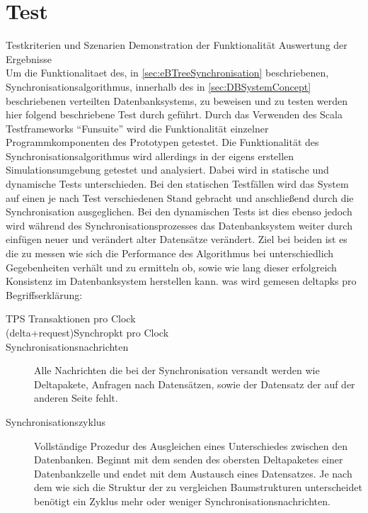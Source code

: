 \documentclass[a4paper,11pt,oneside,%
headsepline,												%
footsepline,												%
bibtotocnumbered									%
]{scrreprt}
\begin{document}
\chapter{Test}

 Testkriterien und Szenarien
Demonstration der Funktionalität
Auswertung der Ergebnisse\\

Um die Funktionalitaet des, in \autoref{sec:eBTreeSynchronisation} beschriebenen, Synchronisationsalgorithmus, innerhalb des in \autoref{sec:DBSystemConcept}	beschriebenen verteilten Datenbanksystems, zu beweisen und zu testen werden hier folgend beschriebene Test durch geführt. Durch das Verwenden des Scala Testframeworks \enquote{Funsuite} wird die Funktionalität einzelner Programmkomponenten des Prototypen getestet. Die Funktionalität des Synchronisationsalgorithmus wird allerdings in der eigens erstellen Simulationsumgebung getestet und analysiert. Dabei wird in statische und dynamische Tests unterschieden. Bei den statischen Testfällen wird das System auf einen je nach Test verschiedenen Stand gebracht und anschließend durch die Synchronisation ausgeglichen. Bei den dynamischen Tests ist dies ebenso jedoch wird während des Synchronisationsprozesses das Datenbanksystem  weiter durch einfügen neuer und verändert alter Datensätze verändert. Ziel bei beiden ist es die zu messen wie sich die Performance des Algorithmus bei unterschiedlich Gegebenheiten verhält und zu ermitteln ob, sowie wie lang dieser erfolgreich Konsistenz im Datenbanksystem herstellen kann. was wird gemesen deltapks pro
Begriffserklärung:
\begin{description}
	\item[TPS Transaktionen pro Clock]
	\item[(delta+request)Synchropkt pro Clock	]
	\item[Synchronisationsnachrichten] Alle Nachrichten die bei der Synchronisation versandt werden wie Deltapakete, Anfragen nach Datensätzen, sowie der Datensatz der auf der anderen Seite fehlt.
	\item[Synchronisationszyklus] Vollständige Prozedur des Ausgleichen eines Unterschiedes zwischen den Datenbanken. Beginnt mit dem senden des obersten Deltapaketes einer Datenbankzelle und endet mit dem Austausch eines Datensatzes. Je nach dem wie sich die Struktur der zu vergleichen Baumstrukturen unterscheidet benötigt ein Zyklus mehr oder weniger Synchronisationsnachrichten.
\end{description}
\end{document}
